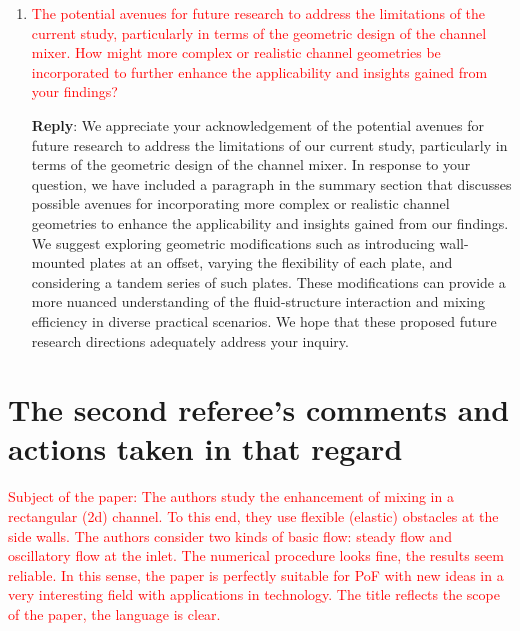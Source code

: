 \documentclass[onecolumn,a4paper,amsmath,amssym,pre]{revtex4}
\begin{document}
\begin{enumerate}
					\item \textcolor{red}{The potential avenues for future research to address the limitations of the current study, particularly in terms of the geometric design of the channel mixer. How might more complex or realistic channel geometries be incorporated to further enhance the applicability and insights gained from your findings?}
					
					\textbf{Reply}: We appreciate your acknowledgement of the potential avenues for future research to address the limitations of our current study, particularly in terms of the geometric design of the channel mixer.
					In response to your question, we have included a paragraph in the summary section that discusses possible avenues for incorporating more complex or realistic channel geometries to enhance the applicability and insights gained from our findings. We suggest exploring geometric modifications such as introducing wall-mounted plates at an offset, varying the flexibility of each plate, and considering a tandem series of such plates. These modifications can provide a more nuanced understanding of the fluid-structure interaction and mixing efficiency in diverse practical scenarios.
					We hope that these proposed future research directions adequately address your inquiry.
				\end{enumerate}	
				
				\newpage	
				
				\section*{The second referee's comments and actions taken in that regard} 
				
				\textcolor{red}{Subject of the paper: The authors study the enhancement of mixing in a rectangular (2d) channel. To this end, they use flexible (elastic) obstacles at the side walls. The authors consider two kinds of basic flow: steady flow and oscillatory flow at the inlet. The numerical procedure looks fine, the results seem reliable. In this sense, the paper is perfectly suitable for PoF with new ideas in a very interesting field with applications in technology. The title reflects the scope of the paper, the language is clear.}\\
				
\end{document}
